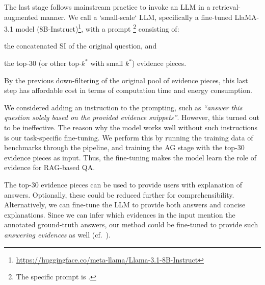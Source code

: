 The last stage follows mainstream practice to invoke an LLM in a retrieval-augmented manner.
We call a `small-scale` LLM, specifically a fine-tuned LlaMA-3.1 model (8B-Instruct)\footnote{\url{https://huggingface.co/meta-llama/Llama-3.1-8B-Instruct}}, with a prompt \footnote{The specific prompt is .}
consisting of:

\squishlist
\item the concatenated SI of the original question, and
\item the top-30 (or other top-$k^*$ with small $k^*$) evidence pieces.
\squishend

By the previous down-filtering of the original pool of evidence pieces, this last step has affordable cost in terms of computation time and energy consumption.

\vspace{0.2cm}
We considered adding an instruction to the prompting, such as {\em ``answer this question solely based on the provided evidence snippets''}.
However, this turned out to be ineffective.
The reason why the model works well without such instructions is our task-specific fine-tuning.
We perform this by running the training data of benchmarks through the \method pipeline,
and training the AG stage with the top-30 evidence pieces as input.
Thus, the fine-tuning makes the model learn the role of evidence for RAG-based QA.

\vspace{0.2cm}
The top-30 evidence pieces can be used to provide users with explanation of answers.
Optionally, these could be reduced further for comprehensibility.
Alternatively, we can fine-tune the LLM to provide both answers and concise explanations.
Since we can infer which evidences in the input mention the annotated ground-truth answers,
our method could be fine-tuned to provide such \textit{answering evidences} as well (cf.~\cite{Gao-citations:emnlp2023}).
